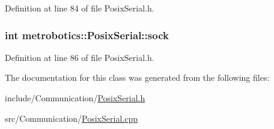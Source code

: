 \-Definition at line 84 of file \-Posix\-Serial.\-h.

\hypertarget{classmetrobotics_1_1PosixSerial_a5b5ad270a13b421343bd39a1b79dcf16}{
\subsubsection[{sock}]{\setlength{\rightskip}{0pt plus 5cm}int {\bf metrobotics\-::\-Posix\-Serial\-::sock}}}\label{classmetrobotics_1_1PosixSerial_a5b5ad270a13b421343bd39a1b79dcf16}


\-Definition at line 86 of file \-Posix\-Serial.\-h.



\-The documentation for this class was generated from the following files\-:\begin{DoxyCompactItemize}
\item 
include/\-Communication/\hyperlink{PosixSerial_8h}{\-Posix\-Serial.\-h}\item 
src/\-Communication/\hyperlink{PosixSerial_8cpp}{\-Posix\-Serial.\-cpp}\end{DoxyCompactItemize}
